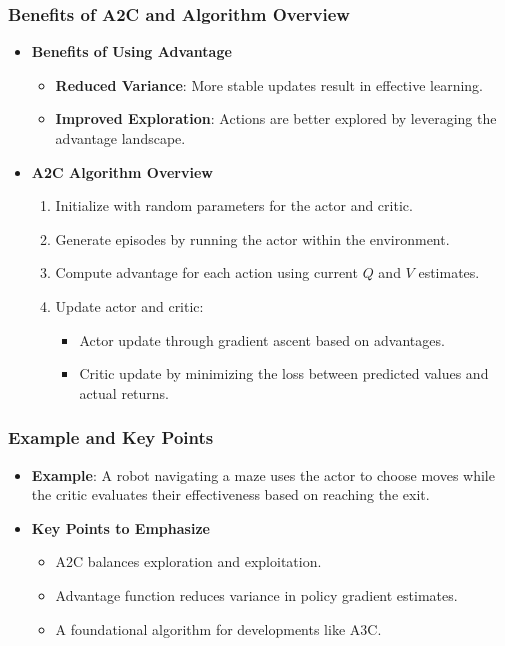 \documentclass{beamer}
\begin{document}
\begin{frame}[fragile]
    \frametitle{Benefits of A2C and Algorithm Overview}
    \begin{itemize}
        \item \textbf{Benefits of Using Advantage}
        \begin{itemize}
            \item \textbf{Reduced Variance}: More stable updates result in effective learning.
            \item \textbf{Improved Exploration}: Actions are better explored by leveraging the advantage landscape.
        \end{itemize}
        \item \textbf{A2C Algorithm Overview}
        \begin{enumerate}
            \item Initialize with random parameters for the actor and critic.
            \item Generate episodes by running the actor within the environment.
            \item Compute advantage for each action using current \( Q \) and \( V \) estimates.
            \item Update actor and critic:
            \begin{itemize}
                \item Actor update through gradient ascent based on advantages.
                \item Critic update by minimizing the loss between predicted values and actual returns.
            \end{itemize}
        \end{enumerate}
    \end{itemize}
\end{frame}

\begin{frame}[fragile]
    \frametitle{Example and Key Points}
    \begin{itemize}
        \item \textbf{Example}: A robot navigating a maze uses the actor to choose moves while the critic evaluates their effectiveness based on reaching the exit.
        \item \textbf{Key Points to Emphasize}
        \begin{itemize}
            \item A2C balances exploration and exploitation.
            \item Advantage function reduces variance in policy gradient estimates.
            \item A foundational algorithm for developments like A3C.
        \end{itemize}
    \end{itemize}
\end{frame}
\end{document}
